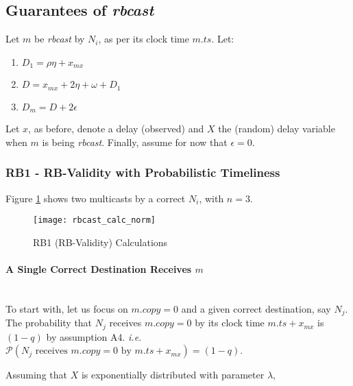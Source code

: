         \subsection*{Guarantees of \emph{rbcast}}
        Let $m$ be \emph{rbcast} by $N_i$, as per its clock time $m.ts$.  Let:
        
        \begin{enumerate}[label=\roman*]
            \item    $D_1 = \rho \eta + x_{mx}$
            \item    $D = x_{mx}  + 2\eta + \omega + D_1$
            \item    $D_m  = D  + 2\epsilon$
        \end{enumerate}
        
        Let $x$, as before, denote a delay (observed) and $X$ the (random) delay variable when $m$ is being \emph{rbcast}.  Finally, assume for now that $\epsilon = 0$.  
        
        \subsubsection*{RB1 - RB-Validity with Probabilistic Timeliness}        
        
        Figure \ref{fig:rbcast_calc} shows two multicasts by a correct $N_i$, with $n = 3$.  
        \begin{figure}[h]
                \centering    
                \centerline{\texttt{[image: rbcast\_calc\_norm]}}
                \caption[RB1 (RB-Validity) Calculations]{RB1 (RB-Validity) Calculations}
                \label{fig:rbcast_calc}
        \end{figure}    
        
        \paragraph{A Single Correct Destination Receives $m$}\hfill \\   
        To start with, let us focus on $m.copy = 0$ and a given correct destination, say $N_j$.  The probability that $N_j$ receives $m.copy = 0$ by its clock time $m.ts + x_{mx}$ is $(1 - q)$ by assumption A4.  \emph{i.e.} $\mathcal{P}(N_j\text{ receives } m.copy = 0 \text{ by } m.ts + x_{mx}) = (1 - q)$.  
        
        Assuming that $X$ is exponentially distributed with parameter $\lambda$, 
        
